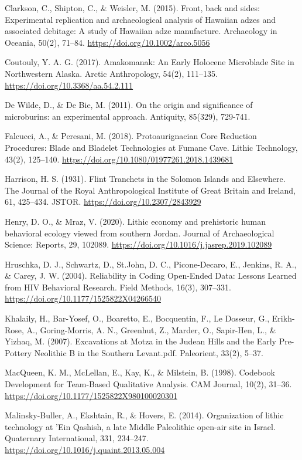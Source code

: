 \documentclass[
]{article}
\begin{document}
Clarkson, C., Shipton, C., \& Weisler, M. (2015). Front, back and sides:
Experimental replication and archaeological analysis of Hawaiian adzes
and associated debitage: A study of Hawaiian adze manufacture.
Archaeology in Oceania, 50(2), 71--84.
\url{https://doi.org/10.1002/arco.5056}

Coutouly, Y. A. G. (2017). Amakomanak: An Early Holocene Microblade Site
in Northwestern Alaska. Arctic Anthropology, 54(2), 111--135.
\url{https://doi.org/10.3368/aa.54.2.111}

De Wilde, D., \& De Bie, M. (2011). On the origin and significance of
microburins: an experimental approach. Antiquity, 85(329), 729-741.

Falcucci, A., \& Peresani, M. (2018). Protoaurignacian Core Reduction
Procedures: Blade and Bladelet Technologies at Fumane Cave. Lithic
Technology, 43(2), 125--140.
\url{https://doi.org/10.1080/01977261.2018.1439681}

Harrison, H. S. (1931). Flint Tranchets in the Solomon Islands and
Elsewhere. The Journal of the Royal Anthropological Institute of Great
Britain and Ireland, 61, 425--434. JSTOR.
\url{https://doi.org/10.2307/2843929}

Henry, D. O., \& Mraz, V. (2020). Lithic economy and prehistoric human
behavioral ecology viewed from southern Jordan. Journal of
Archaeological Science: Reports, 29, 102089.
\url{https://doi.org/10.1016/j.jasrep.2019.102089}

Hruschka, D. J., Schwartz, D., St.John, D. C., Picone-Decaro, E.,
Jenkins, R. A., \& Carey, J. W. (2004). Reliability in Coding Open-Ended
Data: Lessons Learned from HIV Behavioral Research. Field Methods,
16(3), 307--331. \url{https://doi.org/10.1177/1525822X04266540}

Khalaily, H., Bar-Yosef, O., Boaretto, E., Bocquentin, F., Le Dosseur,
G., Erikh-Rose, A., Goring-Morris, A. N., Greenhut, Z., Marder, O.,
Sapir-Hen, L., \& Yizhaq, M. (2007). Excavations at Motza in the Judean
Hills and the Early Pre-Pottery Neolithic B in the Southern Levant.pdf.
Paleorient, 33(2), 5--37.

MacQueen, K. M., McLellan, E., Kay, K., \& Milstein, B. (1998). Codebook
Development for Team-Based Qualitative Analysis. CAM Journal, 10(2),
31--36. \url{https://doi.org/10.1177/1525822X980100020301}

Malinsky-Buller, A., Ekshtain, R., \& Hovers, E. (2014). Organization of
lithic technology at 'Ein Qashish, a late Middle Paleolithic open-air
site in Israel. Quaternary International, 331, 234--247.
\url{https://doi.org/10.1016/j.quaint.2013.05.004}
\end{document}
